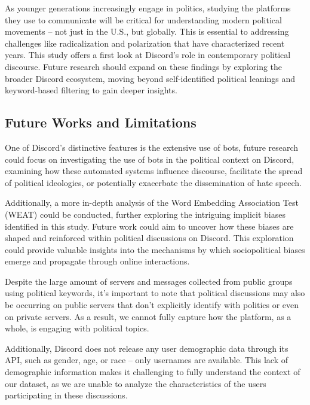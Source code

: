 As younger generations increasingly engage in politics, studying the platforms they use to communicate will be critical for understanding modern political movements -- not just in the U.S., but globally. This is essential to addressing challenges like radicalization and polarization that have characterized recent years. This study offers a first look at Discord’s role in contemporary political discourse. Future research should expand on these findings by exploring the broader Discord ecosystem, moving beyond self-identified political leanings and keyword-based filtering to gain deeper insights. 

\subsection{Future Works and Limitations}

One of Discord's distinctive features is the extensive use of bots, future research could focus on investigating the use of bots in the political context on Discord, examining how these automated systems influence discourse, facilitate the spread of political ideologies, or potentially exacerbate the dissemination of hate speech.

Additionally, a more in-depth analysis of the Word Embedding Association Test (WEAT) could be conducted, further exploring the intriguing implicit biases identified in this study. Future work could aim to uncover how these biases are shaped and reinforced within political discussions on Discord. This exploration could provide valuable insights into the mechanisms by which sociopolitical biases emerge and propagate through online interactions.


Despite the large amount of servers and messages collected from public groups using political keywords, it’s important to note that political discussions may also be occurring on public servers that don't explicitly identify with politics or even on private servers. As a result, we cannot fully capture how the platform, as a whole, is engaging with political topics.

Additionally, Discord does not release any user demographic data through its API, such as gender, age, or race -- only usernames are available. This lack of demographic information makes it challenging to fully understand the context of our dataset, as we are unable to analyze the characteristics of the users participating in these discussions.



